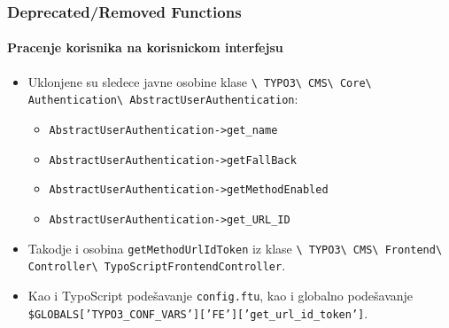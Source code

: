 
\begin{frame}[fragile]
	\frametitle{Deprecated/Removed Functions}
	\framesubtitle{Pracenje korisnika na korisnickom interfejsu}

	\begin{itemize}

		\item Uklonjene su sledece javne osobine klase\newline
			\smaller\texttt{\textbackslash
				TYPO3\textbackslash
				CMS\textbackslash
				Core\textbackslash
				Authentication\textbackslash
				AbstractUserAuthentication}:
			\normalsize\newline


			\begin{itemize}\smaller
				\item \texttt{AbstractUserAuthentication->get\_name}
				\item \texttt{AbstractUserAuthentication->getFallBack}
				\item \texttt{AbstractUserAuthentication->getMethodEnabled}
				\item \texttt{AbstractUserAuthentication->get\_URL\_ID}
			\end{itemize}\normalsize

		\item Takodje i osobina \texttt{getMethodUrlIdToken} iz klase\newline
			\smaller\texttt{\textbackslash
				TYPO3\textbackslash
				CMS\textbackslash
				Frontend\textbackslash
				Controller\textbackslash
				TypoScriptFrontendController}.
			\normalsize

		\item Kao i TypoScript podešavanje \texttt{config.ftu},
			kao i globalno podešavanje
			{\fontsize{8}{8} \selectfont \texttt{\$GLOBALS['TYPO3\_CONF\_VARS']['FE']['get\_url\_id\_token']}.}

	\end{itemize}

\end{frame}



